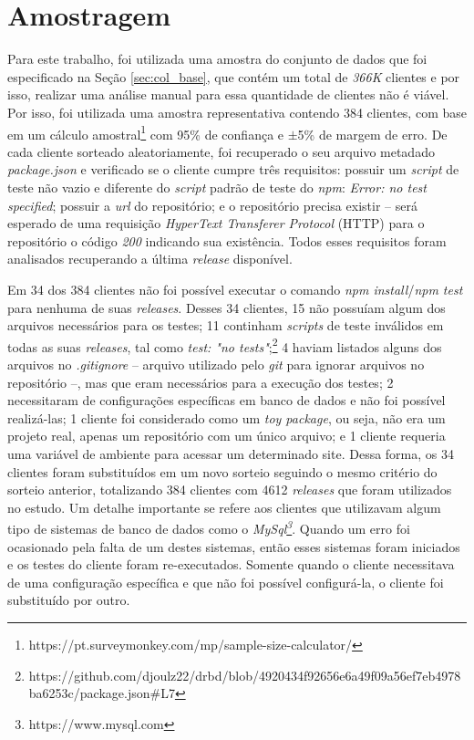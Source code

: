 \section{Amostragem}
\label{sec:col_amostra}
Para este trabalho, foi utilizada uma amostra do conjunto de dados que foi especificado na Seção \ref{sec:col_base}, que contém um total de \textit{366K} clientes e por isso, realizar uma análise manual para essa quantidade de clientes não é viável. Por isso, foi utilizada uma amostra representativa contendo 384 clientes, com base em um cálculo amostral\footnote{https://pt.surveymonkey.com/mp/sample-size-calculator/} com 95\% de confiança e $\pm$5\% de margem de erro. De cada cliente sorteado aleatoriamente, foi recuperado o seu arquivo metadado \textit{package.json} e verificado se o cliente cumpre três requisitos: possuir um \textit{script} de teste não vazio e diferente do \textit{script} padrão de teste do \textit{npm}: \textit{Error: no test specified}; possuir a \textit{url} do repositório; e o repositório precisa existir -- será esperado de uma requisição \textit{HyperText Transferer Protocol} (HTTP) para o repositório o código \textit{200} indicando sua existência. Todos esses requisitos foram analisados recuperando a última \textit{release} disponível.

Em 34 dos 384 clientes não foi possível executar o comando \textit{npm install}/\textit{npm test} para nenhuma de suas \textit{releases}. Desses 34 clientes, 15 não possuíam algum dos arquivos necessários para os testes; 11 continham \textit{scripts} de teste inválidos em todas as suas \textit{releases}, tal como \textit{test: "no tests"};\footnote{https://github.com/djoulz22/drbd/blob/4920434f92656e6a49f09a56ef7eb4978ba6253c/package.json\#L7} 4 haviam listados alguns dos arquivos no \textit{.gitignore} -- arquivo utilizado pelo \textit{git} para ignorar arquivos no repositório --, mas que eram necessários para a execução dos testes; 2 necessitaram de configurações específicas em banco de dados e não foi possível realizá-las; 1 cliente foi considerado como um \textit{toy package}, ou seja, não era um projeto real, apenas um repositório com um único arquivo; e 1 cliente requeria uma variável de ambiente para acessar um determinado site. Dessa forma, os 34 clientes foram substituídos em um novo sorteio seguindo o mesmo critério do sorteio anterior, totalizando 384 clientes com 4612 \textit{releases} que foram utilizados no estudo. Um detalhe importante se refere aos clientes que utilizavam algum tipo de sistemas de banco de dados como o \textit{MySql\footnote{https://www.mysql.com}}. Quando um erro foi ocasionado pela falta de um destes sistemas, então esses sistemas foram iniciados e os testes do cliente foram re-executados. Somente quando o cliente necessitava de uma configuração específica e que não foi possível configurá-la, o cliente foi substituído por outro.

